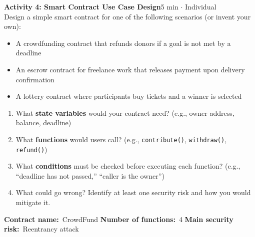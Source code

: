 \documentclass[11pt,a4paper]{article}
\newcommand{\activitybox}[3]{%
  \noindent\colorbox{mllavender4}{\parbox{\dimexpr\linewidth-2\fboxsep}{%
    \textbf{\color{mlpurple}#1}\hfill\textcolor{mlgray}{\small #2}\\[2pt]#3%
  }}\par\vspace{4pt}%
}
\begin{document}
\vspace{2pt}

\activitybox{Activity 4: Smart Contract Use Case Design}{5 min $\cdot$ Individual}{%
Design a simple smart contract for one of the following scenarios (or invent your own):
\begin{itemize}
\item A crowdfunding contract that refunds donors if a goal is not met by a deadline
\item An escrow contract for freelance work that releases payment upon delivery confirmation
\item A lottery contract where participants buy tickets and a winner is selected
\end{itemize}
\begin{enumerate}
\item What \textbf{state variables} would your contract need? (e.g., owner address, balance, deadline)
\item What \textbf{functions} would users call? (e.g., \texttt{contribute()}, \texttt{withdraw()}, \texttt{refund()})
\item What \textbf{conditions} must be checked before executing each function? (e.g., ``deadline has not passed,'' ``caller is the owner'')
\item What could go wrong? Identify at least one security risk and how you would mitigate it.
\end{enumerate}
\vspace{4pt}
\noindent
\textbf{Contract name:}~CrowdFund\quad
\textbf{Number of functions:}~4\quad
\textbf{Main security risk:}~Reentrancy attack
\vspace{2pt}
}
\end{document}
